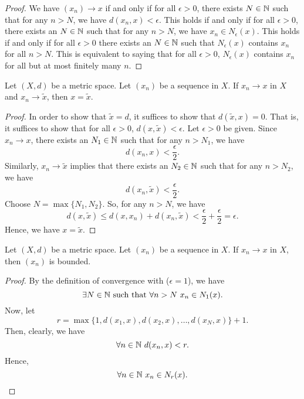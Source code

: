 \documentclass[a4paper]{book}
\begin{document}
\begin{proof}
We have \( ({x}_{n}) \to x  \) if and only if for all \( \epsilon > 0 \), there exists \( N \in \mathbb{N}  \) such that for any \( n > N  \), we have \( d({x}_{n} , x ) < \epsilon \). This holds if and only if for all \( \epsilon > 0  \), there exists an \( N \in \mathbb{N}  \) such that for any \( n > N  \), we have \( {x}_{n} \in {N}_{\epsilon}(x)  \). This holds if and only if for all \( \epsilon > 0  \) there exists an \( N \in \mathbb{N}  \) such that \( {N}_{\epsilon}(x) \) contains \( {x}_{n} \) for all \( n > N  \). This is equivalent to saying that for all \( \epsilon > 0  \), \( {N}_{\epsilon}(x) \) contains \( {x}_{n} \) for all but at most finitely many \( n \). 
\end{proof}

\begin{theorem}
    Let \( (X,d) \) be a metric space. Let \( ({x}_{n}) \) be a sequence in \( X  \). If \( {x}_{n} \to x  \) in \( X  \) and \( {x}_{n} \to \tilde{x} \), then \( x = \tilde{x} \).
\end{theorem}

\begin{proof}
    In order to show that \( \tilde{x} = d  \), it suffices to show that \( d(\tilde{x}, x) = 0  \). That is, it suffices to show that for all \( \epsilon > 0  \), \( d(x, \tilde{x}) < \epsilon \). Let \( \epsilon > 0  \) be given. Since \( {x}_{n} \to x  \), there exists an \( {N}_{1} \in \mathbb{N}  \) such that for any \( n > {N}_{1} \), we have \[ d({x}_{n}, x) < \frac{ \epsilon }{ 2 }.  \] Similarly, \( {x}_{n} \to \tilde{x} \) implies that there exists an \( {N}_{2} \in \mathbb{N}  \) such that for any \( n > {N}_{2} \), we have 
    \[  d({x}_{n}, \tilde{x}) < \frac{ \epsilon }{ 2 }. \]
    Choose \( N = \max \{{N}_{1}, {N}_{2}\} \). So, for any \( n > N  \), we have 
    \[  d(x, \tilde{x}) \leq d(x, {x}_{n}) + d({x}_{n}, \tilde{x}) < \frac{ \epsilon }{ 2 }  + \frac{ \epsilon }{ 2 }  = \epsilon. \]
    Hence, we have \( x = \tilde{x} \).
\end{proof}

\begin{theorem}
   Let \( (X,d) \) be a metric space. Let \( ({x}_{n}) \) be a sequence in \( X  \). If \( {x}_{n}  \to x \) in \( X  \), then \( ({x}_{n}) \) is bounded.  
\end{theorem}
\begin{proof}
By the definition of convergence with (\( \epsilon = 1  \)), we have  
\[  \exists N \in \mathbb{N} \ \text{such that} \ \forall n > N \ {x}_{n} \in {N}_{1}(x). \]
Now, let 
\[  r = \max \{  1 , d({x}_{1}, x), d({x}_{2},x), \dots , d({x}_{N}, x) \} + 1. \]
Then, clearly, we have 
\[  \forall n \in \N \ d({x}_{n},x) < r. \]
Hence, 
\[  \forall n \in \mathbb{N}  \ {x}_{n} \in {N}_{r}(x). \]

\end{proof}
\end{document}
